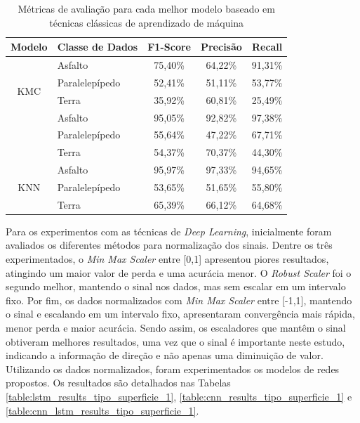 \begin{table}[H]
\scriptsize
\centering
\caption{Métricas de avaliação para cada melhor modelo baseado em técnicas clássicas de aprendizado de máquina} 
\label{table:classical_ml_metrics_tipo_superficie_1}
\begin{tabular}{clccc}
\toprule
\textbf{Modelo} & \multicolumn{1}{c}{\textbf{Classe de Dados}} & \textbf{F1-Score} & \textbf{Precisão} & \textbf{Recall} \\ \midrule
\multirow{4}{*}{KMC} & Asfalto & 75,40\% & 64,22\% & 91,31\% \\ \cmidrule(l){2-5} 
 & Paralelepípedo & 52,41\% & 51,11\% & 53,77\% \\ \cmidrule(l){2-5} 
 & Terra & 35,92\% & 60,81\% & 25,49\% \\ \midrule
\multirow{4}{*}{SVM} & Asfalto & 95,05\% & 92,82\% & 97,38\% \\ \cmidrule(l){2-5} 
 & Paralelepípedo & 55,64\% & 47,22\% & 67,71\% \\ \cmidrule(l){2-5} 
 & Terra & 54,37\% & 70,37\% & 44,30\% \\ \midrule
\multirow{4}{*}{KNN} & Asfalto & 95,97\% & 97,33\% & 94,65\% \\ \cmidrule(l){2-5} 
 & Paralelepípedo & 53,65\% & 51,65\% & 55,80\% \\ \cmidrule(l){2-5} 
 & Terra & 65,39\% & 66,12\% & 64,68\% \\ \bottomrule
\end{tabular}
\end{table}

Para os experimentos com as técnicas de \textit{Deep Learning}, inicialmente foram avaliados os diferentes métodos para normalização dos sinais. Dentre os três experimentados, o \textit{Min Max Scaler} entre [0,1] apresentou piores resultados, atingindo um maior valor de perda e uma acurácia menor. O \textit{Robust Scaler} foi o segundo melhor, mantendo o sinal nos dados, mas sem escalar em um intervalo fixo. Por fim, os dados normalizados com \textit{Min Max Scaler} entre [-1,1], mantendo o sinal e escalando em um intervalo fixo, apresentaram convergência mais rápida, menor perda e maior acurácia. Sendo assim, os escaladores que mantêm o sinal obtiveram melhores resultados, uma vez que o sinal é importante neste estudo, indicando a informação de direção e não apenas uma diminuição de valor. Utilizando os dados normalizados, foram experimentados os modelos de redes propostos. Os resultados são detalhados nas Tabelas \ref{table:lstm_results_tipo_superficie_1}, \ref{table:cnn_results_tipo_superficie_1} e \ref{table:cnn_lstm_results_tipo_superficie_1}.

